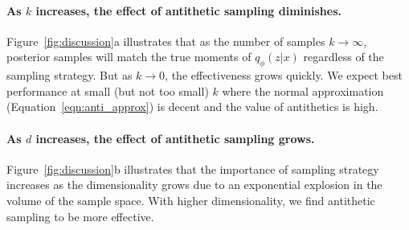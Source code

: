 






\paragraph{As $k$ increases, the effect of antithetic sampling diminishes.}
Figure~\ref{fig:discussion}a illustrates that as the number of samples $k \rightarrow \infty$, posterior samples will match the true moments of $q_\phi(z|x)$ regardless of the sampling strategy. But as $k\rightarrow 0$, the effectiveness grows quickly. We expect best performance at small (but not too small) $k$ where the normal approximation (Equation~\ref{eqn:anti_approx}) is decent and the value of antithetics is high.

\paragraph{As $d$ increases, the effect of antithetic sampling grows.} Figure~\ref{fig:discussion}b illustrates that the importance of sampling strategy increases as the dimensionality grows due to an exponential explosion in the volume of the sample space. With higher dimensionality, we find antithetic sampling to be more effective.

